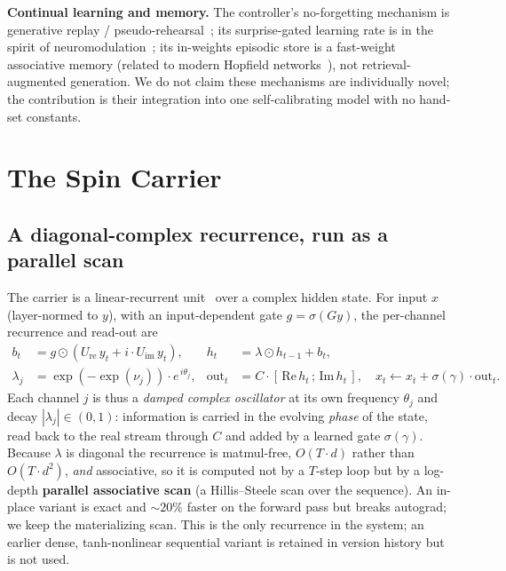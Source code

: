 \documentclass[11pt]{article}
\begin{document}
\textbf{Continual learning and memory.} The controller's no-forgetting mechanism is generative replay / pseudo-rehearsal~\cite{robins1995}; its surprise-gated learning rate is in the spirit of neuromodulation~\cite{doya2002}; its in-weights episodic store is a fast-weight associative memory (related to modern Hopfield networks~\cite{ramsauer2021}), not retrieval-augmented generation. We do not claim these mechanisms are individually novel; the contribution is their integration into one self-calibrating model with no hand-set constants.

\section{The Spin Carrier}
\subsection{A diagonal-complex recurrence, run as a parallel scan}
The carrier is a linear-recurrent unit~\cite{gu2022s4} over a complex hidden state. For input $x$ (layer-normed to $y$), with an input-dependent gate $g=\sigma(G y)$, the per-channel recurrence and read-out are
\begin{align}
b_t &= g \odot (U_{\mathrm{re}}\, y_t + i \cdot U_{\mathrm{im}}\, y_t), & h_t &= \lambda \odot h_{t-1} + b_t, \\
\lambda_j &= \exp(-\exp(\nu_j)) \cdot e^{\,i\theta_j}, & \mathrm{out}_t &= C\cdot[\,\mathrm{Re}\, h_t\, ;\, \mathrm{Im}\, h_t\,], \quad x_t \leftarrow x_t + \sigma(\gamma)\cdot \mathrm{out}_t.
\end{align}
Each channel $j$ is thus a \emph{damped complex oscillator} at its own frequency $\theta_j$ and decay $|\lambda_j|\in(0,1)$: information is carried in the evolving \emph{phase} of the state, read back to the real stream through $C$ and added by a learned gate $\sigma(\gamma)$. Because $\lambda$ is diagonal the recurrence is matmul-free, $O(T\cdot d)$ rather than $O(T\cdot d^2)$, \emph{and} associative, so it is computed not by a $T$-step loop but by a log-depth \textbf{parallel associative scan} (a Hillis--Steele scan over the sequence). An in-place variant is exact and ${\sim}20\%$ faster on the forward pass but breaks autograd; we keep the materializing scan. This is the only recurrence in the system; an earlier dense, tanh-nonlinear sequential variant is retained in version history but is not used.
\end{document}
